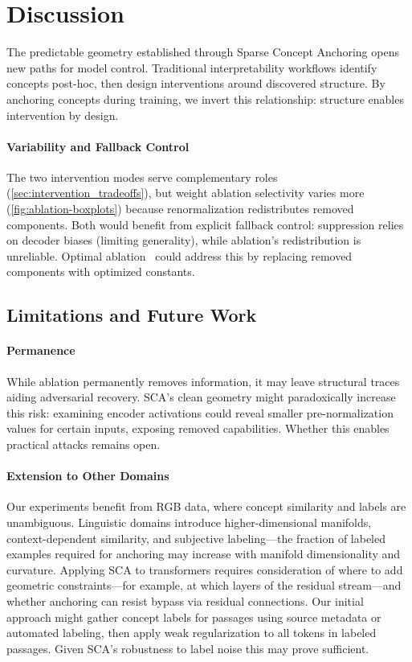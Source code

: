 \section{Discussion}
\label{sec:discussion}

The predictable geometry established through Sparse Concept Anchoring opens new paths for model control. Traditional interpretability workflows identify concepts post-hoc, then design interventions around discovered structure. By anchoring concepts during training, we invert this relationship: structure enables intervention by design.

\paragraph{Variability and Fallback Control}
The two intervention modes serve complementary roles (\cref{sec:intervention_tradeoffs}), but weight ablation selectivity varies more (\cref{fig:ablation-boxplots}) because renormalization redistributes removed components. Both would benefit from explicit fallback control: suppression relies on decoder biases (limiting generality), while ablation's redistribution is unreliable. Optimal ablation~\citep{li2024optimalablationinterpretability} could address this by replacing removed components with optimized constants.

\subsection{Limitations and Future Work}

\paragraph{Permanence}
While ablation permanently removes information, it may leave structural traces aiding adversarial recovery. SCA's clean geometry might paradoxically increase this risk: examining encoder activations could reveal smaller pre-normalization values for certain inputs, exposing removed capabilities. Whether this enables practical attacks remains open.

\paragraph{Extension to Other Domains}
Our experiments benefit from RGB data, where concept similarity and labels are
unambiguous. Linguistic domains introduce higher-dimensional manifolds,
context-dependent similarity, and subjective labeling---the fraction of labeled
examples required for anchoring may increase with manifold dimensionality and
curvature. Applying SCA to transformers requires consideration of where to add
geometric constraints---for example, at which layers of the residual
stream---and whether anchoring can resist bypass via residual connections. Our
initial approach might gather concept labels for passages using source metadata
or automated labeling, then apply weak regularization to all tokens in labeled
passages. Given SCA's robustness to label noise this may prove sufficient.

